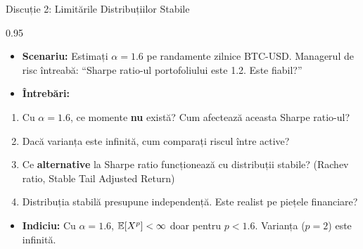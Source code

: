 \documentclass[9pt, aspectratio=169, t]{beamer}
\begin{document}
\begin{frame}{Discuție 2: Limitările Distribuțiilor Stabile}
\begin{cminipage}{0.95\textwidth}
    \begin{itemize}\setlength{\itemsep}{0pt}
        \item \textbf{Scenariu:} Estimați $\alpha = 1.6$ pe randamente zilnice BTC-USD. Managerul de risc întreabă: ``Sharpe ratio-ul portofoliului este 1.2. Este fiabil?''
        \item \textbf{Întrebări:}
    \end{itemize}
    \begin{enumerate}\setlength{\itemsep}{0pt}
        \item Cu $\alpha = 1.6$, ce momente \textbf{nu} există? Cum afectează aceasta Sharpe ratio-ul?
        \item Dacă varianța este infinită, cum comparați riscul între active?
        \item Ce \textbf{alternative} la Sharpe ratio funcționează cu distribuții stabile? (Rachev ratio, Stable Tail Adjusted Return)
        \item Distribuția stabilă presupune independență. Este realist pe piețele financiare?
    \end{enumerate}

    \vspace{0.2cm}
    \begin{itemize}\setlength{\itemsep}{0pt}
        \item \textbf{Indiciu:} Cu $\alpha = 1.6$, $\mathbb{E}[X^p] < \infty$ doar pentru $p < 1.6$. Varianța ($p=2$) este infinită.
    \end{itemize}
\end{cminipage}
\end{frame}
\end{document}
